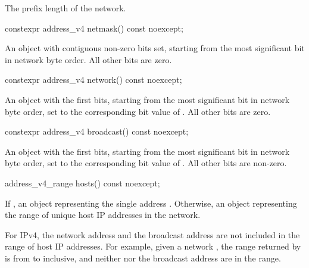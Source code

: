 \begin{itemdescr}
\pnum
\returns The prefix length of the network.
\end{itemdescr}

\begin{itemdecl}
constexpr address_v4 netmask() const noexcept;
\end{itemdecl}

\begin{itemdescr}
\pnum
\returns An  object with  contiguous non-zero bits set, starting from the most significant bit in network byte order. All other bits are zero.
\end{itemdescr}

\begin{itemdecl}
constexpr address_v4 network() const noexcept;
\end{itemdecl}

\begin{itemdescr}
\pnum
\returns An  object with the first  bits, starting from the most significant bit in network byte order, set to the corresponding bit value of . All other bits are zero.
\end{itemdescr}

\begin{itemdecl}
constexpr address_v4 broadcast() const noexcept;
\end{itemdecl}

\begin{itemdescr}
\pnum
\returns An  object with the first  bits, starting from the most significant bit in network byte order, set to the corresponding bit value of . All other bits are non-zero.
\end{itemdescr}

\begin{itemdecl}
address_v4_range hosts() const noexcept;
\end{itemdecl}

\begin{itemdescr}
\pnum
\returns If , an  object representing the single address . Otherwise, an  object representing the range of unique host IP addresses in the network.

\pnum
\begin{note} For IPv4, the network address and the broadcast address are not included in the range of host IP addresses. For example, given a network , the range returned by  is from  to  inclusive, and neither  nor the broadcast address  are in the range. \end{note}
\end{itemdescr}

